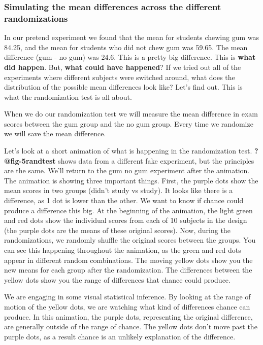 \documentclass[
  letterpaper,
  DIV=11,
  numbers=noendperiod]{scrreprt}
\begin{document}
\subsubsection{Simulating the mean differences across the different
randomizations}\label{simulating-the-mean-differences-across-the-different-randomizations}

In our pretend experiment we found that the mean for students chewing
gum was 84.25, and the mean for students who did not chew gum was 59.65.
The mean difference (gum - no gum) was 24.6. This is a pretty big
difference. This is \textbf{what did happen}. But, \textbf{what could
have happened}? If we tried out all of the experiments where different
subjects were switched around, what does the distribution of the
possible mean differences look like? Let's find out. This is what the
randomization test is all about.

When we do our randomization test we will measure the mean difference in
exam scores between the gum group and the no gum group. Every time we
randomize we will save the mean difference.

Let's look at a short animation of what is happening in the
randomization test. \textbf{?@fig-5randtest} shows data from a different
fake experiment, but the principles are the same. We'll return to the
gum no gum experiment after the animation. The animation is showing
three important things. First, the purple dots show the mean scores in
two groups (didn't study vs study). It looks like there is a difference,
as 1 dot is lower than the other. We want to know if chance could
produce a difference this big. At the beginning of the animation, the
light green and red dots show the individual scores from each of 10
subjects in the design (the purple dots are the means of these original
scores). Now, during the randomizations, we randomly shuffle the
original scores between the groups. You can see this happening
throughout the animation, as the green and red dots appear in different
random combinations. The moving yellow dots show you the new means for
each group after the randomization. The differences between the yellow
dots show you the range of differences that chance could produce.

We are engaging in some visual statistical inference. By looking at the
range of motion of the yellow dots, we are watching what kind of
differences chance can produce. In this animation, the purple dots,
representing the original difference, are generally outside of the range
of chance. The yellow dots don't move past the purple dots, as a result
chance is an unlikely explanation of the difference.
\end{document}
